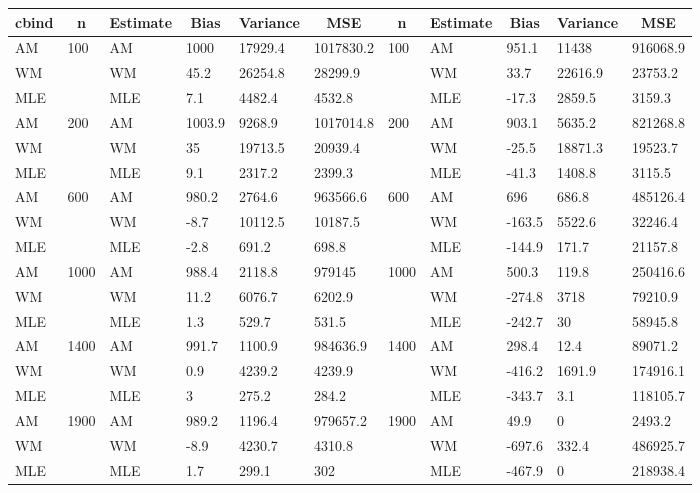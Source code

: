 \begin{table}[!tbp]
\begin{center}
\begin{tabular}{lllllllllll}
\hline\hline
\multicolumn{1}{l}{cbind}&\multicolumn{1}{c}{n}&\multicolumn{1}{c}{Estimate}&\multicolumn{1}{c}{Bias}&\multicolumn{1}{c}{Variance}&\multicolumn{1}{c}{MSE}&\multicolumn{1}{c}{n}&\multicolumn{1}{c}{Estimate}&\multicolumn{1}{c}{Bias}&\multicolumn{1}{c}{Variance}&\multicolumn{1}{c}{MSE}\tabularnewline
\hline
AM&100&AM&1000&17929.4&1017830.2&100&AM&951.1&11438&916068.9\tabularnewline
WM&&WM&45.2&26254.8&28299.9&&WM&33.7&22616.9&23753.2\tabularnewline
MLE&&MLE&7.1&4482.4&4532.8&&MLE&-17.3&2859.5&3159.3\tabularnewline
AM&200&AM&1003.9&9268.9&1017014.8&200&AM&903.1&5635.2&821268.8\tabularnewline
WM&&WM&35&19713.5&20939.4&&WM&-25.5&18871.3&19523.7\tabularnewline
MLE&&MLE&9.1&2317.2&2399.3&&MLE&-41.3&1408.8&3115.5\tabularnewline
AM&600&AM&980.2&2764.6&963566.6&600&AM&696&686.8&485126.4\tabularnewline
WM&&WM&-8.7&10112.5&10187.5&&WM&-163.5&5522.6&32246.4\tabularnewline
MLE&&MLE&-2.8&691.2&698.8&&MLE&-144.9&171.7&21157.8\tabularnewline
AM&1000&AM&988.4&2118.8&979145&1000&AM&500.3&119.8&250416.6\tabularnewline
WM&&WM&11.2&6076.7&6202.9&&WM&-274.8&3718&79210.9\tabularnewline
MLE&&MLE&1.3&529.7&531.5&&MLE&-242.7&30&58945.8\tabularnewline
AM&1400&AM&991.7&1100.9&984636.9&1400&AM&298.4&12.4&89071.2\tabularnewline
WM&&WM&0.9&4239.2&4239.9&&WM&-416.2&1691.9&174916.1\tabularnewline
MLE&&MLE&3&275.2&284.2&&MLE&-343.7&3.1&118105.7\tabularnewline
AM&1900&AM&989.2&1196.4&979657.2&1900&AM&49.9&0&2493.2\tabularnewline
WM&&WM&-8.9&4230.7&4310.8&&WM&-697.6&332.4&486925.7\tabularnewline
MLE&&MLE&1.7&299.1&302&&MLE&-467.9&0&218938.4\tabularnewline
\hline
\end{tabular}\end{center}

\end{table}
